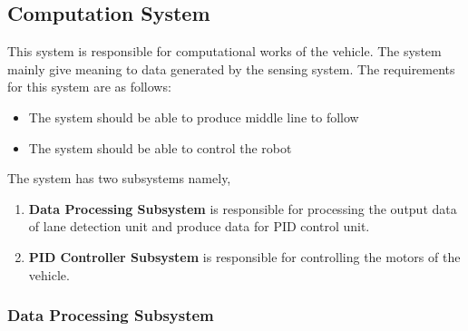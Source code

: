 \documentclass[a4paper,12pt]{article}
\begin{document}


\subsection{Computation System}


This system is responsible for computational works of the vehicle. The system mainly give meaning to data generated by the sensing system. The requirements for this system are as follows: 


\begin{itemize}

\item The system should	be able to produce middle line to follow

\item The system should be able to control the robot

\end{itemize}	


\noindent The system has two subsystems namely,


\begin{enumerate}

\item \textbf{Data Processing Subsystem} is responsible for processing the output data of lane detection unit and produce data for PID control unit.

\item \textbf{PID Controller Subsystem} is responsible for controlling the motors of the vehicle.

\end{enumerate}




\subsubsection{Data Processing Subsystem}\label{sect:dataProcessingSubsystem}
\end{document}
